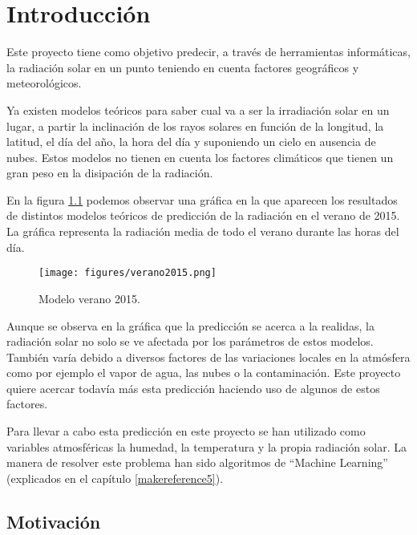 \cleardoublepage

\chapter{Introducción}
\label{makereference1}

Este proyecto tiene como objetivo predecir, a través de herramientas informáticas, la radiación solar en un punto teniendo en cuenta factores geográficos y meteorológicos.

Ya existen modelos teóricos para saber cual va a ser la irradiación solar en un lugar, a partir la inclinación de los rayos solares en función de la longitud, la latitud, el día del año, la hora del día y suponiendo un cielo en ausencia de nubes. Estos modelos no tienen en cuenta los factores climáticos que tienen un gran peso en la disipación de la radiación.

En la figura \ref{modelo_verano} podemos observar una gráfica en la que aparecen los resultados de distintos modelos teóricos de predicción de la radiación en el verano de 2015. La gráfica representa la radiación media de todo el verano durante las horas del día.

\begin{figure}[htb]
	\begin{center}
		\texttt{[image: figures/verano2015.png]}
		\caption{Modelo verano 2015. \label{modelo_verano}} 
	\end{center}
\end{figure}

Aunque se observa en la gráfica que la predicción se acerca a la realidas, la radiación solar no solo se ve afectada por los parámetros de estos modelos. También varía debido a diversos factores de las variaciones locales en la atmósfera como por ejemplo el vapor de agua, las nubes o la contaminación. Este proyecto quiere acercar todavía más esta predicción haciendo uso de algunos de estos factores.

Para llevar a cabo esta predicción en este proyecto se han utilizado como variables atmosféricas la humedad, la temperatura y la propia radiación solar. La manera de resolver este problema han sido algoritmos de ``Machine Learning'' (explicados en el capítulo \ref{makereference5}).

\section{Motivación}
\label{makereference1.1}


